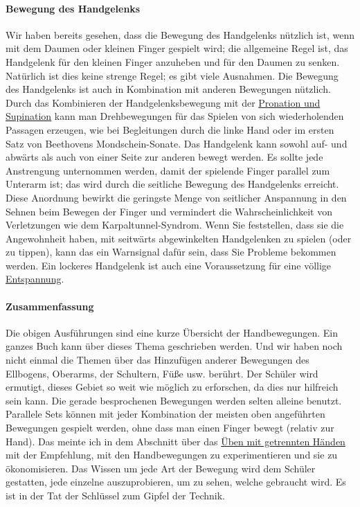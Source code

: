\paragraph{Bewegung des Handgelenks}

Wir haben bereits gesehen, dass die Bewegung des Handgelenks nützlich ist, wenn mit dem Daumen oder kleinen Finger gespielt wird; die allgemeine Regel ist, das Handgelenk für den kleinen Finger anzuheben und für den Daumen zu senken.
Natürlich ist dies keine strenge Regel; es gibt viele Ausnahmen.
Die Bewegung des Handgelenks ist auch in Kombination mit anderen Bewegungen nützlich.
Durch das Kombinieren der Handgelenksbewegung mit der \hyperref[c1iii4ProSup]{Pronation und Supination} kann man Drehbewegungen für das Spielen von sich wiederholenden Passagen erzeugen, wie bei Begleitungen durch die linke Hand oder im ersten Satz von Beethovens Mondschein-Sonate.
Das Handgelenk kann sowohl auf- und abwärts als auch von einer Seite zur anderen bewegt werden.
Es sollte jede Anstrengung unternommen werden, damit der spielende Finger parallel zum Unterarm ist; das wird durch die seitliche Bewegung des Handgelenks erreicht.
Diese Anordnung bewirkt die geringste Menge von seitlicher Anspannung in den Sehnen beim Bewegen der Finger und vermindert die Wahrscheinlichkeit von Verletzungen wie dem Karpaltunnel-Syndrom.
Wenn Sie feststellen, dass sie die Angewohnheit haben, mit seitwärts abgewinkelten Handgelenken zu spielen (oder zu tippen), kann das ein Warnsignal dafür sein, dass Sie Probleme bekommen werden.
Ein lockeres Handgelenk ist auch eine Voraussetzung für eine völlige \hyperref[c1ii14]{Entspannung}.


\paragraph{Zusammenfassung}

Die obigen Ausführungen sind eine kurze Übersicht der Handbewegungen.
Ein ganzes Buch kann über dieses Thema geschrieben werden.
Und wir haben noch nicht einmal die Themen über das Hinzufügen anderer Bewegungen des Ellbogens, Oberarms, der Schultern, Füße usw. berührt.
Der Schüler wird ermutigt, dieses Gebiet so weit wie möglich zu erforschen, da dies nur hilfreich sein kann.
Die gerade besprochenen Bewegungen werden selten alleine benutzt.
Parallele Sets können mit jeder Kombination der meisten oben angeführten Bewegungen gespielt werden, ohne dass man einen Finger bewegt (relativ zur Hand).
Das meinte ich in dem Abschnitt über das \hyperref[c1ii7]{Üben mit getrennten Händen} mit der Empfehlung, mit den Handbewegungen zu experimentieren und sie zu ökonomisieren.
Das Wissen um jede Art der Bewegung wird dem Schüler gestatten, jede einzelne auszuprobieren, um zu sehen, welche gebraucht wird.
Es ist in der Tat der Schlüssel zum Gipfel der Technik.



